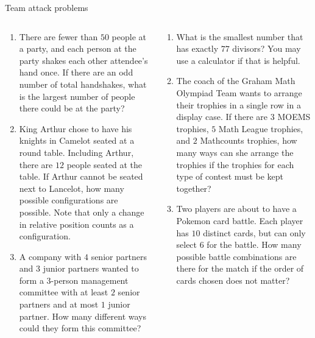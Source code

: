 \documentclass[9pt,aspectratio=169]{beamer}
\begin{document}
\begin{frame}{Team attack problems}
  \begin{columns}[T]
    \begin{column}{0.5\textwidth}
      \begin{enumerate}
        \item There are fewer than $50$ people at a party, and each person at the party shakes each other attendee’s hand once. If there are an odd number of total handshakes, what is the largest number of people there could be at the party?​
        \item King Arthur chose to have his knights in Camelot seated at a round table.  Including Arthur, there are $12$ people seated at the table.  If Arthur cannot be seated next to Lancelot, how many possible configurations are possible.  Note that only a change in relative position counts as a configuration.​
        \item A company with $4$ senior partners and $3$ junior partners wanted to form a $3$-person management committee with at least $2$ senior partners and at most $1$ junior partner.  How many different ways could they form this committee?
        \seti
      \end{enumerate}
    \end{column}
    \begin{column}{0.5\textwidth}
      \begin{enumerate}
        \conti
        \item What is the smallest number that has exactly $77$ divisors? You may use a calculator if that is helpful.​
        \item The coach of the Graham Math Olympiad Team wants to arrange their trophies in a single row in a display case.  If there are $3$ MOEMS trophies, $5$ Math League trophies, and $2$ Mathcounts trophies, how many ways can she arrange the trophies if the trophies for each type of contest must be kept together?​
        \item Two players are about to have a Pokemon card battle.  Each player has $10$ distinct cards, but can only select $6$ for the battle.  How many possible battle combinations are there for the match if the order of cards chosen does not matter?​
      \end{enumerate}
    \end{column}
  \end{columns}
\end{frame}

\end{document}
